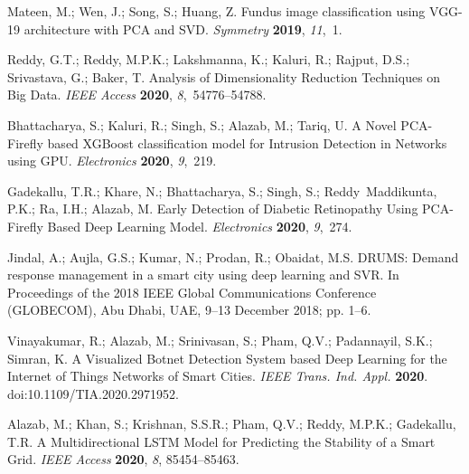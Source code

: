 \documentclass[electronics,article,accept ,moreauthors,pdftex]{mdpi}
\begin{document}
\begin{thebibliography}{999}
Mateen, M.; Wen, J.; Song, S.; Huang, Z.
Fundus image classification using VGG-19 architecture with PCA and SVD.
{\em Symmetry} {\bf 2019}, {\em 11},~1.

{Reddy}, G.T.; {Reddy}, M.P.K.; {Lakshmanna}, K.; {Kaluri}, R.; {Rajput}, D.S.;
 {Srivastava}, G.; {Baker}, T.
Analysis of Dimensionality Reduction Techniques on Big Data.
{\em IEEE Access} {\bf 2020}, {\em 8},~54776--54788.

Bhattacharya, S.; Kaluri, R.; Singh, S.; Alazab, M.; Tariq, U.
A Novel PCA-Firefly based XGBoost classification model for Intrusion
 Detection in Networks using GPU.
{\em Electronics} {\bf 2020}, {\em 9},~219.

Gadekallu, T.R.; Khare, N.; Bhattacharya, S.; Singh, S.; Reddy~Maddikunta,
 P.K.; Ra, I.H.; Alazab, M.
Early Detection of Diabetic Retinopathy Using PCA-Firefly Based Deep
 Learning Model.
{\em Electronics} {\bf 2020}, {\em 9},~274.

Jindal, A.; Aujla, G.S.; Kumar, N.; Prodan, R.; Obaidat, M.S.
DRUMS: Demand response management in a smart city using deep learning
 and SVR.
In Proceedings of the 2018 IEEE Global Communications Conference (GLOBECOM), Abu Dhabi, UAE, 9--13 December 2018; pp. 1--6.

Vinayakumar, R.; Alazab, M.; Srinivasan, S.; Pham, Q.V.; Padannayil, S.K.;
 Simran, K.
A Visualized Botnet Detection System based Deep Learning for the
 Internet of Things Networks of Smart Cities.
{\em IEEE Trans. Ind. Appl.} {\bf 2020}.
doi:10.1109/TIA.2020.2971952.

Alazab, M.; Khan, S.; Krishnan, S.S.R.; Pham, Q.V.; Reddy, M.P.K.; Gadekallu,
 T.R.
A Multidirectional LSTM Model for Predicting the Stability of a Smart
 Grid.
{\em IEEE Access} {\bf 2020}, \emph{8}, 85454--85463.


\end{thebibliography}
\end{document}
